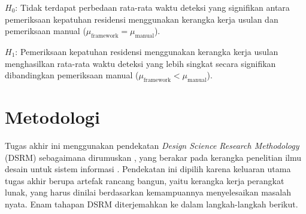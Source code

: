 \noindent $H_0$: Tidak terdapat perbedaan rata-rata waktu deteksi yang signifikan antara pemeriksaan kepatuhan residensi menggunakan kerangka kerja usulan dan pemeriksaan manual ($\mu_{\mathrm{framework}} = \mu_{\mathrm{manual}}$).

\noindent $H_1$: Pemeriksaan kepatuhan residensi menggunakan kerangka kerja usulan menghasilkan rata-rata waktu deteksi yang lebih singkat secara signifikan dibandingkan pemeriksaan manual ($\mu_{\mathrm{framework}} < \mu_{\mathrm{manual}}$).


\section{Metodologi}

\label{sec:metodologi}

Tugas akhir ini menggunakan pendekatan \textit{Design Science Research Methodology} (DSRM\label{abbr:dsrm}) sebagaimana dirumuskan \textcite{peffers2007}, yang berakar pada kerangka penelitian ilmu desain untuk sistem informasi \autocite{hevner2004}. Pendekatan ini dipilih karena keluaran utama tugas akhir berupa artefak rancang bangun, yaitu kerangka kerja perangkat lunak, yang harus dinilai berdasarkan kemampuannya menyelesaikan masalah nyata. Enam tahapan DSRM diterjemahkan ke dalam langkah-langkah berikut.

